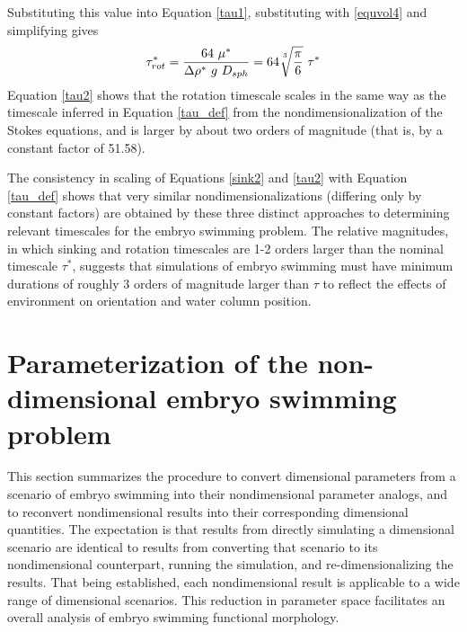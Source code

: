 \documentclass[10pt,a4paper]{article}
\begin{document}
Substituting this value into Equation \ref{tau1}, substituting with \ref{equvol4} and simplifying gives
\begin{equation}\label{tau2}
	\tau^*_{rot} = \frac{64 ~ \mu^*}{\Delta \rho^* ~ g ~ D_{sph}} 
	=  64\sqrt[\uproot{5}3]{\frac{\pi}{6}} ~ \tau^*
\end{equation}
Equation \ref{tau2} shows that the rotation timescale scales in the same way as the timescale inferred in Equation \ref{tau_def} from the nondimensionalization of the Stokes equations, and is larger by about two orders of magnitude (that is, by a constant factor of 51.58).

The consistency in scaling of Equations \ref{sink2} and \ref{tau2} with Equation \ref{tau_def} shows that very similar nondimensionalizations (differing only by constant factors) are obtained by these three distinct approaches to determining relevant timescales for the embryo swimming problem.
The relative magnitudes, in which sinking and rotation timescales are 1-2 orders larger than the nominal timescale $\tau^*$, suggests that simulations of embryo swimming must have minimum durations of roughly 3 orders of magnitude larger than $\tau$ to reflect the effects of environment on orientation and water column position.


\section{Parameterization of the non-dimensional embryo swimming problem}\label{NDparsSect}
This section summarizes the procedure to convert dimensional parameters from a scenario of embryo swimming into their nondimensional parameter analogs, and to reconvert nondimensional results into their corresponding dimensional quantities.
The expectation is that results from directly simulating a dimensional scenario are identical to results from converting that scenario to its nondimensional counterpart, running the simulation, and re-dimensionalizing the results.
That being established, each nondimensional result is applicable to a wide range of dimensional scenarios. This reduction in parameter space facilitates an overall analysis of embryo swimming functional morphology.
\end{document}

